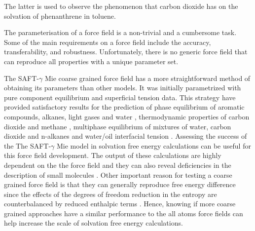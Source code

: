 The latter is used to observe the phenomenon that carbon dioxide has on the solvation of phenanthrene in toluene.

The parameterisation of a force field is a non-trivial and a cumbersome task. Some of
the main requirements on a force field include the accuracy, transferability, and robustness. Unfortunately, there is no generic force field that can reproduce all properties with a
unique parameter set.

The SAFT-$\gamma$ Mie coarse grained force field has a more straightforward method of obtaining its parameters than other models. It was initially parametrized with pure component equilibrium and superficial tension data. This strategy have provided satisfactory results for the prediction of phase equilibrium of aromatic compounds, alkanes, light gases and water \cite{herdes2015,muller2017,lobanova2015} , thermodynamic properties of carbon dioxide and methane \cite{cassiano}, multiphase equilibrium of mixtures of water, carbon dioxide and n-alkanes \cite{lobanova2016} and water/oil interfacial tension \cite{herdes2017}. Assessing the success of the The SAFT-$\gamma$ Mie model in solvation free energy calculations can be useful for this force field development. The output of these calculations are highly dependent on the the force field and they can also reveal deficiencies in the description of small molecules \cite{mobley2007,shirts2013}. Other important reason for testing a coarse grained force field is that they can generally reproduce free energy difference since the effects of the degrees of freedom reduction  in the entropy are counterbalanced by reduced enthalpic terms \cite{kmiecik2016}. Hence, knowing if more coarse grained approaches have a similar performance to the all atoms force fields can help increase the scale of solvation free energy calculations. 